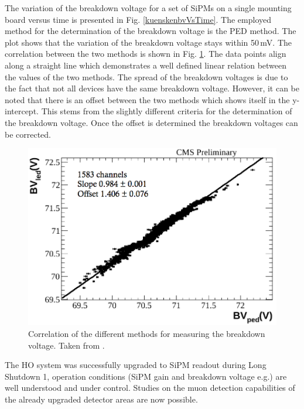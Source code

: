 The variation of the breakdown voltage for a set of SiPMs on a single mounting board versus time is presented in Fig. \ref{kuenskenbvVsTime}. The employed method for the determination of the breakdown voltage is the PED method. The plot shows that the variation of the breakdown voltage stays within 50\,mV. The correlation between the two methods is shown in Fig. \ref{kuenskenbvCorr}. The data points align along a straight line which demonstrates a well defined linear relation between the values of the two methods. The spread of the breakdown voltages is due to the fact that not all devices have the same breakdown voltage. However, it can be noted that there is an offset between the two methods which shows itself in the y-intercept. This stems from the slightly different criteria for the determination of the breakdown voltage. Once the offset is determined the breakdown voltages can be corrected.
\begin{figure}
\centering
\begin{minipage}[htbp]{0.475\textwidth}
\includegraphics[width=\textwidth]{Figures/kuensken/bvCorrelation.png}
\end{minipage}
\hspace{0.5cm}
\begin{minipage}[htbp]{0.475\textwidth}
\caption{Correlation of the different methods for measuring the breakdown voltage. Taken from \cite{kuenskenCalor}.}
\label{kuenskenbvCorr}
\end{minipage}
\end{figure}
\newline
The HO system was successfully upgraded to SiPM readout during Long Shutdown 1, operation conditions (SiPM gain and breakdown voltage e.g.) are well understood and under control.
Studies on the muon detection capabilities of the already upgraded detector areas are now possible.